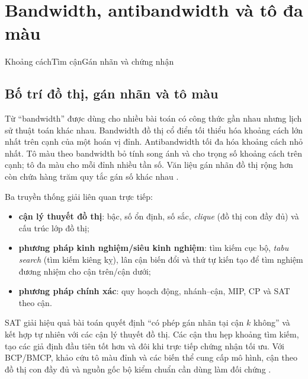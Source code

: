 \chapter{Bandwidth, antibandwidth và tô đa màu}


  {Khoảng cách}{Tìm cận}{Gán nhãn và chứng nhận}

\section{Bố trí đồ thị, gán nhãn và tô màu}

Từ ``bandwidth'' được dùng cho nhiều bài toán có công thức gần nhau nhưng lịch
sử thuật toán khác nhau. Bandwidth đồ thị cổ điển tối thiểu hóa khoảng cách
lớn nhất trên cạnh của một hoán vị đỉnh. Antibandwidth tối đa hóa khoảng cách
nhỏ nhất. Tô màu theo bandwidth bỏ tính song ánh và cho trọng số khoảng cách
trên cạnh; tô đa màu cho mỗi đỉnh nhiều tần số. Văn liệu gán nhãn đồ thị rộng
hơn còn chứa hàng trăm quy tắc gán số khác nhau
\parencite{gallian2024labeling}.

Ba truyền thống giải liên quan trực tiếp:
\begin{itemize}
  \item \textbf{cận lý thuyết đồ thị}: bậc, số ổn định, số sắc,
        \emph{clique} (đồ thị con đầy đủ) và cấu
        trúc lớp đồ thị;
  \item \textbf{phương pháp kinh nghiệm/siêu kinh nghiệm}: tìm kiếm cục bộ,
        \emph{tabu search} (tìm kiếm kiêng kỵ), lân cận biến đổi và thứ tự kiến tạo để tìm
        nghiệm đương nhiệm cho
        cận trên/cận dưới;
  \item \textbf{phương pháp chính xác}: quy hoạch động, nhánh--cận, MIP, CP và
        SAT theo cận.
\end{itemize}

SAT giải hiệu quả bài toán quyết định ``có phép gán nhãn tại cận \(k\) không''
và kết hợp tự nhiên với các cận lý thuyết đồ thị. Các cận thu hẹp khoảng tìm
kiếm, tạo các giả định đầu tiên tốt hơn và đôi khi trực tiếp chứng nhận tối ưu.
Với BCP/BMCP, khảo cứu tô màu đỉnh và các biến thể cung cấp mô hình, cận theo
đồ thị con đầy đủ
và nguồn gốc bộ kiểm chuẩn cần dùng làm đối chứng
\parencite{malaguti2010coloring}.

